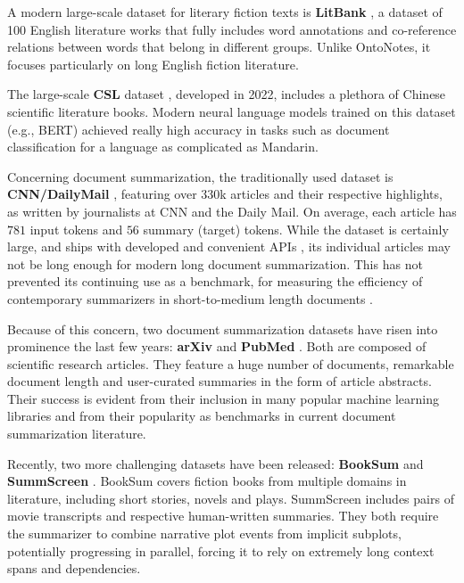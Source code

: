 \documentclass[preprint,review,10pt]{elsarticle}
\begin{document}
	A modern large-scale dataset for literary fiction texts is \textbf{LitBank} \cite{bamman}, a dataset of 100 English literature works that fully includes word annotations and co-reference relations between words that belong in different groups. Unlike OntoNotes, it focuses particularly on long English fiction literature.
	
	The large-scale \textbf{CSL} dataset \cite{li}, developed in 2022, includes a plethora of Chinese scientific literature books. Modern neural language models trained on this dataset (e.g., BERT) achieved really high accuracy in tasks such as document classification for a language as complicated as Mandarin.
	
	Concerning document summarization, the traditionally used dataset is \textbf{CNN/DailyMail} \cite{nallapati2}, featuring over 330k articles and their respective highlights, as written by journalists at CNN and the Daily Mail. On average, each article has $781$ input tokens and $56$ summary (target) tokens. While the dataset is certainly large, and ships with developed and convenient APIs \cite{tf_cnn_dailymail, kaggle_cnn_dailymail, hugging_face_cnn_dailymail}, its individual articles may not be long enough for modern long document summarization. This has not prevented its continuing use as a benchmark, for measuring the efficiency of contemporary summarizers in short-to-medium length documents \cite{big_bird}.
	
	Because of this concern, two document summarization datasets have risen into prominence the last few years: \textbf{arXiv} \cite{clement} \cite{gong} and \textbf{PubMed} \cite{sumpubmed} \cite{franck}. Both are composed of scientific research articles. They feature a huge number of documents, remarkable document length and user-curated summaries in the form of article abstracts. Their success is evident from their inclusion in many popular machine learning libraries \cite{tf_datasets} \cite{kaggle_arxiv} \cite{hugging_face_arxiv} \cite{hugging_face_pubmed} and from their popularity as benchmarks in current document summarization literature.
	
	Recently, two more challenging datasets have been released: \textbf{BookSum} \cite{poland} and \textbf{SummScreen} \cite{summset}. BookSum covers fiction books from multiple domains in literature, including short stories, novels and plays. SummScreen includes pairs of movie transcripts and respective human-written summaries. They both require the summarizer to combine narrative plot events from implicit subplots, potentially progressing in parallel, forcing it to rely on extremely long context spans and dependencies.
	
\end{document}
